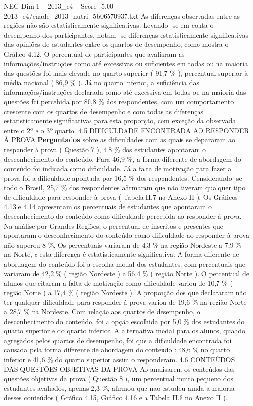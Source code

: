 \begin{textsample}{NEG Dim 1 – 2013\_c4 – Score -5.00 – 2013\_c4/enade\_2013\_nutri\_5b06570937.txt}
As diferenças observadas entre as regiões não são estatisticamente significativas.
Levando -se em conta o desempenho dos participantes, notam -se diferenças estatisticamente significativas das opiniões de estudantes entre os quartos de desempenho, como mostra o Gráfico 4.12.
O percentual de participantes que avaliaram as informações/instruções como até excessivas ou suficientes em todas ou na maioria das questões foi mais elevado no quarto superior ( 91,7 \% ), percentual superior à média nacional ( 86,9 \% ).
Já no quarto inferior, a suficiência das informações/instruções declarada como até excessiva em todas ou na maioria das questões foi percebida por 80,8 \% dos respondentes, com um comportamento crescente com os quartos de desempenho e com todas as diferenças estatisticamente significativas para esta proporção, com exceção da observada entre o 2º e o 3º quarto. 4.5 DIFICULDADE ENCONTRADA AO RESPONDER À PROVA \textbf{Perguntados} sobre as dificuldades com as quais se depararam ao responder à prova ( Questão 7 ), 4,8 \% dos estudantes apontaram o desconhecimento do conteúdo.
Para 46,9 \%, a forma diferente de abordagem do conteúdo foi indicada como dificuldade.
Já a falta de motivação para fazer a prova foi a dificuldade apontada por 16,5 \% dos respondentes.
Considerando -se todo o Brasil, 25,7 \% dos respondentes afirmaram que não tiveram qualquer tipo de dificuldade para responder à prova ( Tabela II.7 no Anexo II ).
Os Gráficos 4.13 e 4.14 apresentam os percentuais de estudantes que apontaram o desconhecimento do conteúdo como dificuldade percebida ao responder à prova.
Na análise por Grandes Regiões, o percentual de inscritos e presentes que apontaram o desconhecimento do conteúdo como dificuldade ao responder à prova não superou 8 \%.
Os percentuais variaram de 4,3 \% na região Nordeste a 7,9 \% na Norte, e esta diferença é estatisticamente significativa.
A forma diferente de abordagem do conteúdo foi a escolha modal dos estudantes, com percentuais que variaram de 42,2 \% ( região Nordeste ) a 56,4 \% ( região Norte ).
O percentual de alunos que citaram a falta de motivação como dificuldade variou de 10,7 \% ( região Norte ) a 17,4 \% ( região Nordeste ).
A proporção dos que declararam não ter qualquer dificuldade para responder à prova variou de 19,6 \% na região Norte a 28,7 \% na Nordeste.
Com relação aos quartos de desempenho, o desconhecimento do conteúdo, foi a opção escolhida por 5,0 \% dos estudantes do quarto superior e do quarto inferior.
A alternativa modal para os alunos, quando agregados pelos quartos de desempenho, foi que a dificuldade encontrada foi causada pela forma diferente de abordagem do conteúdo : 48,6 \% no quarto inferior e 41,6 \% do quarto superior assim o responderam. 4.6 CONTEÚDOS DAS QUESTÕES OBJETIVAS DA PROVA Ao analisarem os conteúdos das questões objetivas da prova ( Questão 8 ), um percentual muito pequeno dos estudantes avaliados, apenas 2,3 \%, afirmou que não estudou ainda a maioria desses conteúdos ( Gráfico 4.15, Gráfico 4.16 e a Tabela II.8 no Anexo II ).

\end{textsample}
